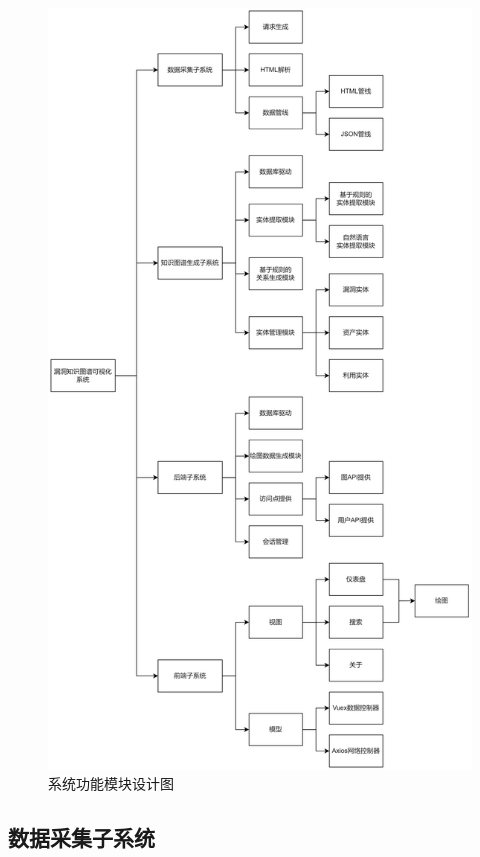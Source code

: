 \documentclass[a4paper,AutoFakeBold,oneside,12pt]{book}
\begin{document}
\begin{figure}
	\includegraphics[height=0.95\textheight]{pictures/CyKG_OrgChart-中文.png}
	\caption{系统功能模块设计图}
	\label{CyKG_OrgChart}
\end{figure}

\subsection{数据采集子系统}
\end{document}
